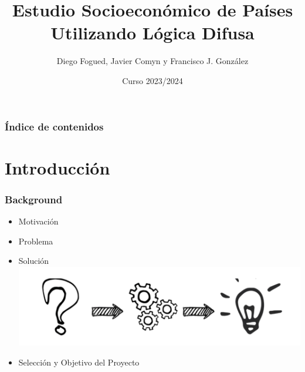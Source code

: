 \documentclass{beamer}
\title{Estudio Socioeconómico de Países\\ Utilizando Lógica Difusa}
\author{Diego Fogued, Javier Comyn y Francisco J. González}
\institute{Universidad Politécnica de Madrid}
\date{Curso 2023/2024}
\newcommand{\slideauthor}[1]{\gdef\insertslideauthor{#1}}
\newcommand{\insertslideauthor}{}
\begin{document}
\frame{\titlepage}

\begin{frame}
\frametitle{Índice de contenidos}
\tableofcontents
\end{frame}

\section{Introducción}
\begin{frame}
\frametitle{Background}
\slideauthor{Diego Fogued}
\begin{itemize}
    \item Motivación
    \vspace{0.45cm} 
    \item Problema
    \item Solución \hfill \includegraphics[width=0.3\linewidth]{Images/image-Photoroom.png}
    \vspace{0.45cm} 
    \item Selección y Objetivo del Proyecto
\end{itemize}

\end{frame}
\end{document}
